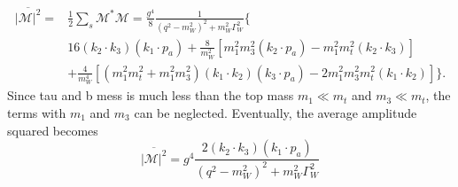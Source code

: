 \begin{equation}
\begin{split}
	\overline{ |\mathcal{M}|^2 } = & \frac{1}{2} \sum_s \mathcal{M}^* \mathcal{M} =
	\frac{g^4}{8} \frac{1}{ (q^2-m^2_{W})^2 +  m^2_W \Gamma^2_W } \bigg \{  \\
	& 16  (  k_2 \cdot k_3) (  k_1 \cdot p_a) + \frac{8}{m^2_W} [ m_1^2 m_3^2 (k_2 \cdot p_a) - m_1^2 m_t^2 (k_2 \cdot k_3)] \\
	&  + \frac{4}{m^4_W} [ (m_1^2 m_t^2 + m_1^2 m_3^2) (k_1 \cdot k_2) (k_3 \cdot p_a) - 2  m_1^2 m_3^2 m_t^2  (k_1 \cdot k_2) ]\bigg\} .
\end{split}
\end{equation}
\noindent Since tau and b mess is much less than the top mass $m_1 \ll m_t $ and $m_3 \ll m_t$, the terms with $m_1$ and $m_3$ can be neglected. Eventually, the average amplitude squared becomes
\begin{equation}
	\overline{ |\mathcal{M}|^2 } =  g^4 \frac{2  (  k_2 \cdot k_3) (  k_1 \cdot p_a) }{ (  q^2-m^2_{W})^2 +  m^2_W \Gamma^2_W }  
    \label{eqn:relatedWorks:bsm:smTopDecay:smTopDecay:m2}
\end{equation}

